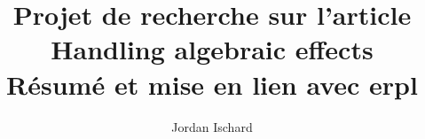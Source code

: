 \usepackage[utf8]{inputenc}
\usepackage{version}

\usepackage{amssymb,amsmath,amsthm}
\usepackage{graphicx}
\usepackage{enumerate}
\usepackage{tikz}
\usetikzlibrary{matrix,arrows}
\usepackage{todonotes}
\usepackage{fullpage}
\usepackage{hyperref}
\usepackage[french,linesnumbered,lined,boxed,commentsnumbered,ruled,vlined]{algorithm2e}

\renewcommand{\contentsname}{Sommaire}   


%
%

\usepackage{tikz}
\usetikzlibrary{positioning}
\usetikzlibrary{calc}

\usepackage[affil-it]{authblk}

\renewcommand*{\Authsep}{, }
\renewcommand*{\Authand}{, }
\renewcommand*{\Authands}{, }

\title{Projet de recherche sur l'article \textbf{Handling algebraic effects}\\
Résumé et mise en lien avec \textbf{erpl}}

\author[1]{Jordan Ischard}


\date{}

\newtheorem{theorem}{Théorème}
\newtheorem{lemma}{Lemme}
\newtheorem{corollary}[theorem]{Corollaire}
\newtheorem{claim}[theorem]{Claim}
\newtheorem{proposition}[theorem]{Proposition}
\newtheorem{definition}{Définition}
\theoremstyle{definition}
\newtheorem*{remark}{Remarque}
\newtheorem{exemple}{Exemple}

\newenvironment{proofclaim}{
	\noindent \emph{Proof.}
}{%
	\hfill $\diamond$ \\
}

\newcommand{\probleme}[4]{

    \vspace{0.4cm}
    \fbox{
        \begin{minipage}{0.95 \linewidth}
            \centerline{\textsc{\underline{#1}}}
            \textbf{Entr\'ee} : #2 \\ \textbf{#4} : #3
        \end{minipage}
    }
    \vspace{0.4cm}

}

\newcommand{\RMV}{\todo[inline]{Paragraphe à supprimer}}
\renewcommand*{\proofname}{Preuve}
